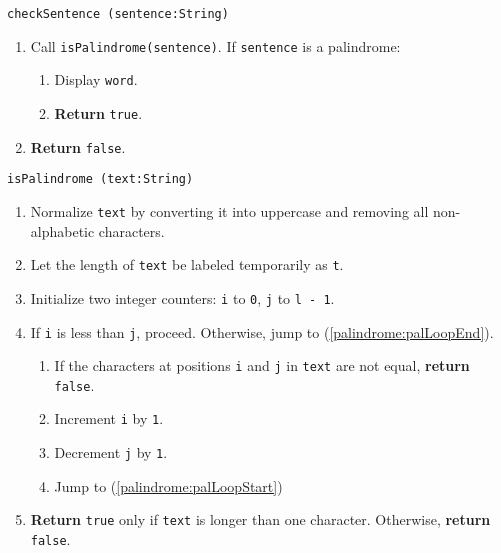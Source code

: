 \vspace{5mm}
{\tt checkSentence (sentence:String)}
\begin{enumerate}
	\item	Call {\tt isPalindrome(sentence)}. If {\tt sentence} is a palindrome:
	\begin{enumerate}
		\item	Display {\tt word}.
		\item	{\bf Return} {\tt true}.
	\end{enumerate}
\item	{\bf Return} {\tt false}.
\end{enumerate}
\vspace{5mm}
{\tt isPalindrome (text:String)}
\begin{enumerate}
	\item	Normalize {\tt text} by converting it into uppercase and removing all non-alphabetic characters.
	\item	Let the length of {\tt text} be labeled temporarily as {\tt t}.
	\item	Initialize two integer counters: {\tt i} to {\tt 0}, {\tt j} to {\tt l - 1}.
	\item	If {\tt i} is less than {\tt j}, proceed.
			Otherwise, jump to (\ref{palindrome:palLoopEnd}). \label{palindrome:palLoopStart}
	\begin{enumerate}
		\item	If the characters at positions {\tt i} and {\tt j} in {\tt text} are not equal,
				{\bf return} {\tt false}.
		\item	Increment {\tt i} by {\tt 1}.
		\item	Decrement {\tt j} by {\tt 1}.
		\item	Jump to (\ref{palindrome:palLoopStart})
	\end{enumerate}
	\item	{\bf Return} {\tt true} only if {\tt text} is longer than
			one character. Otherwise, {\bf return} {\tt false}. \label{palindrome:palLoopEnd}
\end{enumerate}

\clearpage
\sourcecode


